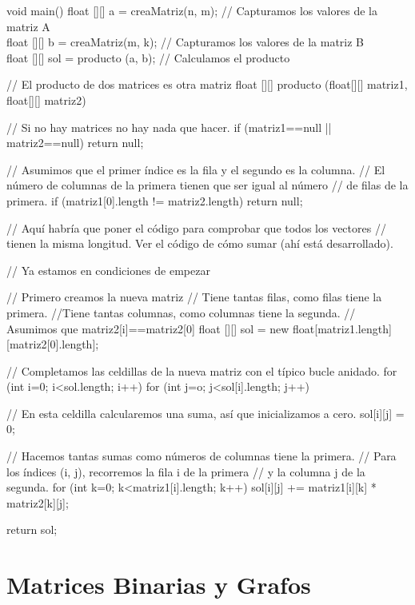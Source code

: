 \documentclass[10pt]{article}
\begin{document}
\begin{code}[caption=Suma de Matrices, label=default]
void main() {
  float [][] a = creaMatriz(n, m); // Capturamos los valores de la matriz A \\
  float [][] b = creaMatriz(m, k); // Capturamos los valores de la matriz B \\
  float [][] sol = producto (a, b);  // Calculamos el producto \\
} 

// El producto de dos matrices es otra matriz
float [][] producto (float[][] matriz1, float[][] matriz2) {
   // Si no hay matrices no hay nada que hacer.
   if (matriz1==null || matriz2==null) return null;
   
   // Asumimos que el primer índice es la fila y el segundo es la columna.
   // El número de columnas de la primera tienen que ser igual al número
   // de filas de la primera.
   if (matriz1[0].length != matriz2.length) return null;
   
   // Aquí habría que poner el código para comprobar que todos los vectores
   // tienen la misma longitud. Ver el código de cómo sumar (ahí está desarrollado).
   
   // Ya estamos en condiciones de empezar
   
   // Primero creamos la nueva matriz
   // Tiene tantas filas, como filas tiene la primera.
   //Tiene tantas columnas, como columnas tiene la segunda.
   // Asumimos que matriz2[i]==matriz2[0]
   float [][] sol = new float[matriz1.length][matriz2[0].length];
   
   // Completamos las celdillas de la nueva matriz con el típico bucle anidado.
   for (int i=0; i<sol.length; i++)
     for (int j=o; j<sol[i].length; j++) {
       // En esta celdilla calcularemos una suma, así que inicializamos a cero.
       sol[i][j] = 0;
       
       // Hacemos tantas sumas como números de columnas tiene la primera.
       // Para los índices (i, j), recorremos la fila i de la primera
       // y la columna j de la segunda.
       for (int k=0; k<matriz1[i].length; k++) {
         sol[i][j] += matriz1[i][k] * matriz2[k][j];
       }
     }
     
   return sol;
}    
\end{code}

\section{Matrices Binarias y Grafos} 
\end{document}
